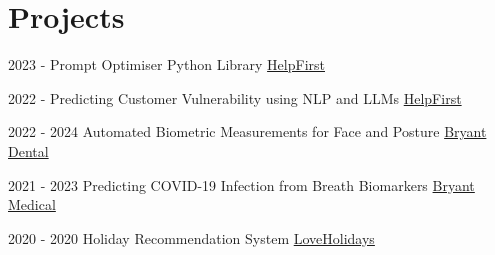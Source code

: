 \documentclass[print]{cv-style}          %
\begin{document}
\section{Projects}
\begin{entrylist}
\vspace{-0.4cm}
\entry
{2023 - }
{Prompt Optimiser Python Library}
{\href{https://www.helpfirst.ai/}{HelpFirst}}
{\jobtitle{}}

\vspace{-0.3cm}
\entry
{2022 - }
{Predicting Customer Vulnerability using NLP and LLMs}
{\href{https://www.helpfirst.ai/}{HelpFirst}}
{\jobtitle{}}


\vspace{-0.3cm}
\entry
{2022 - 2024}
{Automated Biometric Measurements for Face and Posture}
{\href{https://bryant.dental/}{Bryant Dental}}
{\jobtitle{}}

\vspace{-0.3cm}
\entry
{2021 - 2023}
{Predicting COVID-19 Infection from Breath Biomarkers}
{\href{https://bryant.dental/}{Bryant Medical}}
{\jobtitle{}}


\vspace{-0.3cm}
\entry
{2020 - 2020}
{Holiday Recommendation System}
{\href{https://www.loveholidays.com/}{LoveHolidays}}
{\jobtitle{}}


\end{entrylist}





\end{document}
